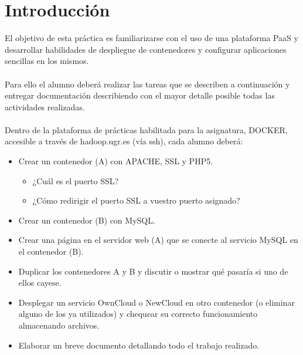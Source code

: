 \setcounter{page}{0}

\maketitle %
\thispagestyle{empty}

\newpage %

\tableofcontents %


\newpage


\section{Introducción}

El objetivo de esta práctica es familiarizarse con el uso de una plataforma PaaS y desarrollar habilidades de despliegue de contenedores y configurar aplicaciones sencillas en los mismos.
\\ \\
Para ello el alumno deberá realizar las tareas que se describen a continuación y entregar documentación describiendo con el mayor detalle posible todas las actividades realizadas.
\\ \\
Dentro de la plataforma de prácticas habilitada para la asignatura, DOCKER, accesible a través de hadoop.ugr.es (vía ssh), cada alumno deberá:

\begin{itemize}
	\item Crear un contenedor (A) con APACHE, SSL y PHP5.
	\begin{itemize}
		\item ¿Cuál es el puerto SSL?
		\item ¿Cómo redirigir el puerto SSL a vuestro puerto asignado?
	\end{itemize}
	\item Crear un contenedor (B) con MySQL.
	\item Crear una página en el servidor web (A) que se conecte al servicio MySQL en el contenedor (B).
	\item Duplicar los contenedores A y B y discutir o mostrar qué pasaría si uno de ellos cayese.
	\item Desplegar un servicio OwnCloud o NewCloud en otro contenedor (o eliminar alguno de los ya utilizados) y chequear su correcto funcionamiento almacenando archivos.
	\item Elaborar un breve documento detallando todo el trabajo realizado.
\end{itemize}

